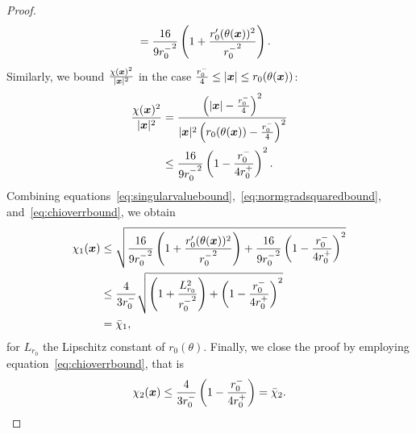 \begin{proof}
\begin{align}
        &= \frac{16}{9{r_0^-} ^2} \left( 1+ \frac{r_0'(\theta({{\bm{x}}})) ^2}{{r_0^-}^2}    \right)\label{eq:normgradsquaredbound}.
    \end{align}
    Similarly, we bound $\frac{\chi({{\bm{x}}})^2}{|{{\bm{x}}}|^2}$ in the case $\frac{r_0^-}{4} \leq |{{\bm{x}}}| \leq r_0(\theta({{\bm{x}}}))$:
    \begin{align}
        \frac{\chi({{\bm{x}}})^2}{|{{\bm{x}}}|^2}&=\frac{\left(|{{\bm{x}}}| - \frac{r_0^-}{4}\right)^2 }{|{{\bm{x}}}|^2\left( r_0(\theta({{\bm{x}}}))-\frac{r_0^-}{4}\right)^2}\nonumber\\
        &\leq\frac{16}{{9r_0^-}^2} \left(1 - \frac{r_0^-}{4r_0^+}\right)^2.  \label{eq:chioverrbound}
    \end{align}
    Combining equations~\eqref{eq:singularvaluebound},~\eqref{eq:normgradsquaredbound}, and~\eqref{eq:chioverrbound}, we obtain
    \begin{align*}
        \chi_1({{\bm{x}}}) &\leq \sqrt{\frac{16}{9{r_0^-} ^2} \left( 1+ \frac{r_0'(\theta({{\bm{x}}})) ^2}{{r_0^-}^2}    \right) + \frac{16}{{9r_0^-}^2} \left(1 - \frac{r_0^-}{4r_0^+}\right)^2 }\\
        &\leq \frac{4}{3{r_0^-}} \sqrt{ \left( 1+ \frac{L_{r_0} ^2}{{r_0^-}^2}    \right) + \left(1 - \frac{r_0^-}{4r_0^+}\right)^2 }\\
        &=\bar{\chi}_1,
    \end{align*}
    for $L_{r_0}$ the Lipschitz constant of $r_0(\theta)$.
    Finally, we close the proof by employing equation~\eqref{eq:chioverrbound}, that is
    \begin{align*}
        \chi_2(\x)%
        \leq  \frac{4}{{3r_0^-}} \left(1 - \frac{r_0^-}{4r_0^+}\right)
        =\bar{\chi}_2.
    \end{align*}
\end{proof}